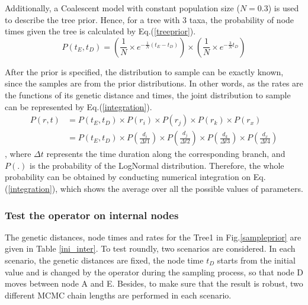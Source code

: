 \documentclass{bmcart}
\begin{document}
Additionally, a Coalescent model with constant population size ($N=0.3$) is used to describe the tree prior. Hence, for a tree with 3 taxa, the probability of node times given the tree is calculated by Eq.(\ref{treeprior}).
\begin{equation}\label{treeprior}
P({t_E},{t_D}) = (\frac{1}{N} \times {e^{ - \frac{1}{N}({t_E} - {t_D})}}) \times (\frac{1}{N} \times {e^{ - \frac{3}{N}{t_D}}})
\end{equation}

After the prior is specified, the distribution to sample can be exactly known, since the samples are from the prior distributions. In other words, as the rates are the functions of its genetic distance and times, the joint distribution to sample can be represented by Eq.(\ref{integration}).
\begin{equation}\label{integration}
\begin{aligned}
P(r,t) &= P({t_E},{t_D}) \times P({r_i}) \times P({r_j}) \times P({r_k}) \times P({r_x}) \\&= P({t_E},{t_D}) \times P(\frac{{{d_i}}}{{\Delta t1}}) \times P(\frac{{{d_j}}}{{\Delta t2}}) \times P(\frac{{{d_k}}}{{\Delta t3}}) \times P(\frac{{{d_x}}}{{\Delta t4}})
\end{aligned}
\end{equation}
, where ${\Delta t}$ represents the time duration along the corresponding branch, and $P({.})$ is the probability of the LogNormal distribution. Therefore, the whole probability can be obtained by conducting numerical integration on Eq.(\ref{integration}), which shows the average over all the possible values of parameters.
\subsubsection*{Test the operator on internal nodes}
The genetic distances, node times and rates for the Tree1 in Fig.\ref{sampleprior} are given in Table \ref{ini_inter}. To test roundly, two scenarios are considered. In each scenario, the genetic distances are fixed, the node time $t_D$ starts from the initial value and is changed by the operator during the sampling process, so that node D moves between node A and E. Besides, to make sure that the result is robust, two different MCMC chain lengths are performed in each scenario.
\end{document}
